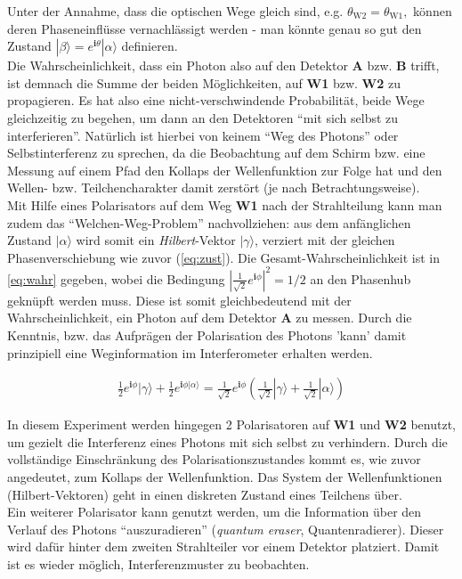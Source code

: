 \documentclass[numbers=noenddot,a4paper,notitlepage,twoside,BCOR15mm]{scrartcl}
\newcommand{\ix}[1]{_\text{#1}}
\newcommand{\imag}{\mathbf{i}}
\newcommand{\tilt}[1]{\textit{#1}}
\newcommand{\fett}[1]{\textbf{#1}}
\newcommand{\ket}[1]{|#1\rangle}
\begin{document}
				Unter der Annahme, dass die optischen Wege gleich sind, e.g. $\theta\ix{W2}=\theta\ix{W1},$ können deren Phaseneinflüsse vernachlässigt werden - man könnte genau so gut den Zustand $\ket{\beta}=e^{\imag\theta}\ket{\alpha}$ definieren.\\
				Die Wahrscheinlichkeit, dass ein Photon also auf den Detektor \fett{A} bzw. \fett{B} trifft, ist demnach die Summe der beiden Möglichkeiten, auf \fett{W1} bzw. \fett{W2} zu propagieren. Es hat also eine nicht-verschwindende Probabilität, beide Wege gleichzeitig zu begehen, um dann an den Detektoren "`mit sich selbst zu interferieren"'. Natürlich ist hierbei von keinem "`Weg des Photons"' oder Selbstinterferenz zu sprechen, da die Beobachtung auf dem Schirm bzw. eine Messung auf einem Pfad den Kollaps der Wellenfunktion zur Folge hat und den Wellen- bzw. Teilchencharakter damit zerstört (je nach Betrachtungsweise).\\
				Mit Hilfe eines Polarisators auf dem Weg \fett{W1} nach der Strahlteilung kann man zudem das \enquote{Welchen-Weg-Problem} nachvollziehen: aus dem anfänglichen Zustand $\ket{\alpha}$ wird somit ein \tilt{Hilbert}-Vektor $\ket{\gamma}$, verziert mit der gleichen Phasenverschiebung wie zuvor (\autoref{eq:zust}). Die Gesamt-Wahrscheinlichkeit ist in \autoref{eq:wahr} gegeben, wobei die Bedingung $|\frac{1}{\sqrt{2}}e^{\imag\phi}|^2=1/2$ an den Phasenhub geknüpft werden muss. Diese ist somit gleichbedeutend mit der Wahrscheinlichkeit, ein Photon auf dem Detektor \fett{A} zu messen. Durch die Kenntnis, bzw. das Aufprägen der Polarisation des Photons 'kann' damit prinzipiell eine Weginformation im Interferometer erhalten werden.

					\begin{align}
						\frac{1}{2}e^{\imag\phi}\ket{\gamma}+\frac{1}{2}e^{\imag\phi\ket{\alpha}}=\frac{1}{\sqrt{2}}e^{\imag\phi}\left(\frac{1}{\sqrt{2}}\ket{\gamma}+\frac{1}{\sqrt{2}}\ket{\alpha}\right) \label{eq:wahr}
					\end{align}

				In diesem Experiment werden hingegen 2 Polarisatoren auf \fett{W1} und \fett{W2} benutzt, um gezielt die Interferenz eines Photons mit sich selbst zu verhindern. Durch die vollständige Einschränkung des Polarisationszustandes kommt es, wie zuvor angedeutet, zum Kollaps der Wellenfunktion. Das System der Wellenfunktionen (Hilbert-Vektoren) geht in einen diskreten Zustand eines Teilchens über.\\
				Ein weiterer Polarisator kann genutzt werden, um die Information über den Verlauf des Photons "`auszuradieren"' (\tilt{quantum eraser}, Quantenradierer). Dieser wird dafür hinter dem zweiten Strahlteiler vor einem Detektor platziert. Damit ist es wieder möglich, Interferenzmuster zu beobachten.
\end{document}
